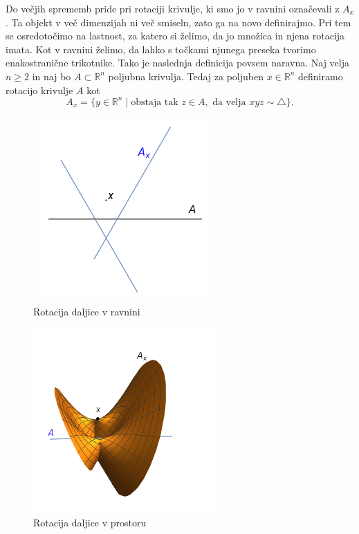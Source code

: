 \documentclass[mat1]{fmfdelo}
\newcommand{\R}{\mathbb R}
\begin{document}
Do večjih sprememb pride pri rotaciji krivulje, ki smo jo v ravnini označevali z $A_x$. Ta objekt v več dimenzijah ni več smiseln, zato ga na novo definirajmo. Pri tem se osredotočimo na lastnost, za katero si želimo, da jo množica in njena rotacija imata. Kot v ravnini želimo, da lahko s točkami njunega preseka tvorimo enakostranične trikotnike. Tako je naslednja definicija povsem naravna. Naj velja $n \geq 2$ in naj bo $A \subset \R^n$ poljubna krivulja. Tedaj za poljuben $x \in \R^n$ definiramo rotacijo krivulje $A$ kot 
\[ A_x = \{y \in \R^n \mid \text{obstaja tak } z \in A, \text{ da velja } xyz \sim \triangle \}. \]

\begin{figure}[h!]
\centering
\includegraphics[width = 200pt, height = 200pt]{rotacija_druga_ravnina.png}
\caption{Rotacija daljice v ravnini}
\label{fig:rotacija_sprem_ravnina}
\end{figure}

\begin{figure}[h!]
\centering
\includegraphics[width = 200pt, height = 200pt]{rotacija_druga_prostor.png}
\caption{Rotacija daljice v prostoru}
\label{fig:rotacija_sprem_prostor}
\end{figure}
\end{document}
